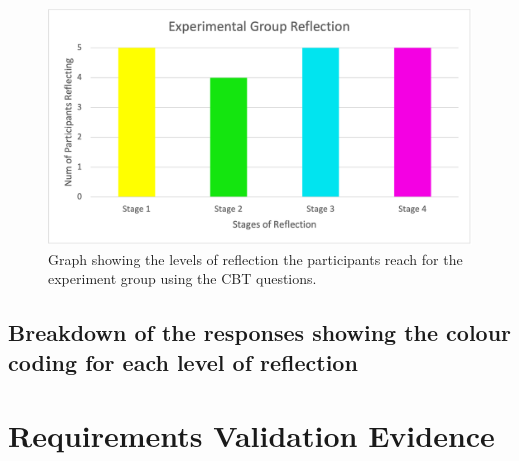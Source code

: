 \documentclass{l4proj}
\begin{document}
\begin{appendices}
\begin{figure}[H]
    \begin{centering}
    \includegraphics[scale=0.5]{images/ABExperimentGraph.png}
    \caption{Graph showing the levels of reflection the participants reach for the experiment group using the CBT questions.}
    \label{fig: Appen-ExperimentGraph}
    \end{centering}
\end{figure}

\subsection{Breakdown of the responses showing the colour coding for each level of reflection} \label{Appendix-AB-responses}





%

\section{Requirements Validation Evidence} \label{Appendix-ReqsValidationEvidence}


\end{appendices}
\end{document}
